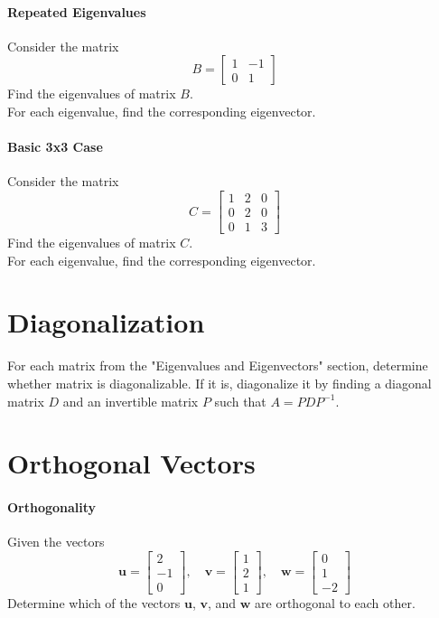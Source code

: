 \documentclass[]{article}
\begin{document}
	\paragraph{Repeated Eigenvalues}
	Consider the matrix
	$$B = \begin{bmatrix}
		1 & -1 \\
		0 & 1
	\end{bmatrix}$$
	Find the eigenvalues of matrix $B$.\\
	For each eigenvalue, find the corresponding eigenvector.
	
	\paragraph{Basic 3x3 Case}
	Consider the matrix
	$$C = \begin{bmatrix}
		1 & 2 & 0 \\
		0 & 2 & 0 \\
		0 & 1 & 3
	\end{bmatrix}$$
	Find the eigenvalues of matrix $C$.\\
	For each eigenvalue, find the corresponding eigenvector.
	
	
	\section{Diagonalization}
	For each matrix from the "Eigenvalues and Eigenvectors" section,  determine whether matrix is diagonalizable.
	If it is, diagonalize it by finding a diagonal matrix $D$ and an invertible matrix $P$ such that $A = PDP^{-1}$.
	
	\section{Orthogonal Vectors}
	\paragraph{Orthogonality}
	Given the vectors
	$$
	\mathbf{u} = \begin{bmatrix}
		2 \\
		-1 \\
		0
	\end{bmatrix}, \quad
	\mathbf{v} = \begin{bmatrix}
		1 \\
		2 \\
		1
	\end{bmatrix}, \quad
	\mathbf{w} = \begin{bmatrix}
		0 \\
		1 \\
		-2
	\end{bmatrix}
	$$
	Determine which of the vectors $\mathbf{u}$, $\mathbf{v}$, and $\mathbf{w}$ are orthogonal to each other.
	
\end{document}
